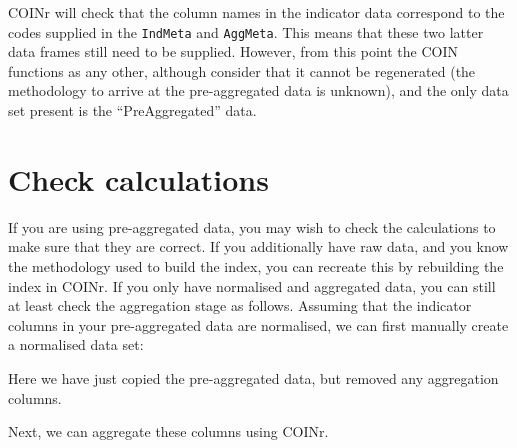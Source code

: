 \documentclass[
]{book}
\newenvironment{Shaded}{\begin{snugshade}}{\end{snugshade}}
\newcommand{\AttributeTok}[1]{\textcolor[rgb]{0.77,0.63,0.00}{#1}}
\newcommand{\CommentTok}[1]{\textcolor[rgb]{0.56,0.35,0.01}{\textit{#1}}}
\newcommand{\DocumentationTok}[1]{\textcolor[rgb]{0.56,0.35,0.01}{\textbf{\textit{#1}}}}
\newcommand{\FunctionTok}[1]{\textcolor[rgb]{0.00,0.00,0.00}{#1}}
\newcommand{\NormalTok}[1]{#1}
\newcommand{\OtherTok}[1]{\textcolor[rgb]{0.56,0.35,0.01}{#1}}
\newcommand{\SpecialCharTok}[1]{\textcolor[rgb]{0.00,0.00,0.00}{#1}}
\newcommand{\StringTok}[1]{\textcolor[rgb]{0.31,0.60,0.02}{#1}}
\begin{document}
COINr will check that the column names in the indicator data correspond to the codes supplied in the \texttt{IndMeta} and \texttt{AggMeta}. This means that these two latter data frames still need to be supplied. However, from this point the COIN functions as any other, although consider that it cannot be regenerated (the methodology to arrive at the pre-aggregated data is unknown), and the only data set present is the ``PreAggregated'' data.

\hypertarget{check-calculations}{%
\section{Check calculations}\label{check-calculations}}

If you are using pre-aggregated data, you may wish to check the calculations to make sure that they are correct. If you additionally have raw data, and you know the methodology used to build the index, you can recreate this by rebuilding the index in COINr. If you only have normalised and aggregated data, you can still at least check the aggregation stage as follows. Assuming that the indicator columns in your pre-aggregated data are normalised, we can first manually create a normalised data set:

\begin{Shaded}
\end{Shaded}

Here we have just copied the pre-aggregated data, but removed any aggregation columns.

Next, we can aggregate these columns using COINr.

\begin{Shaded}
\end{Shaded}
\end{document}
